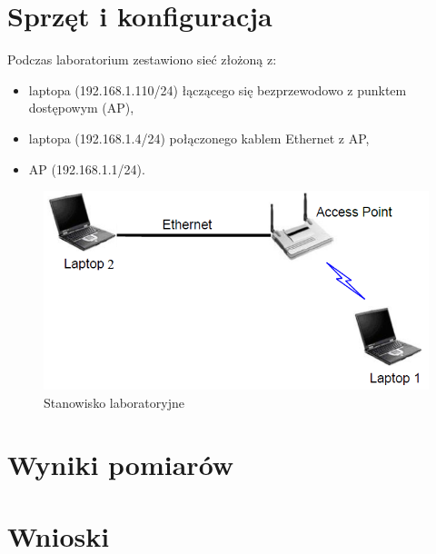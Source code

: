 \documentclass[12pt, a4paper, oneside]{article}
\begin{document}
\section{Sprzęt i konfiguracja}
\indent\indent Podczas laboratorium zestawiono sieć złożoną z:
\begin{itemize}
\item laptopa (192.168.1.110/24) łączącego się bezprzewodowo z punktem dostępowym (AP),
\item laptopa (192.168.1.4/24) połączonego kablem Ethernet z AP,
\item AP (192.168.1.1/24).
\end{itemize}
\begin{figure}[h!]
\centering
\includegraphics[scale=0.4]{pics/f1.png}
\caption{Stanowisko laboratoryjne}
\end{figure}
\clearpage
\section{Wyniki pomiarów}
\section{Wnioski}
\end{document}
